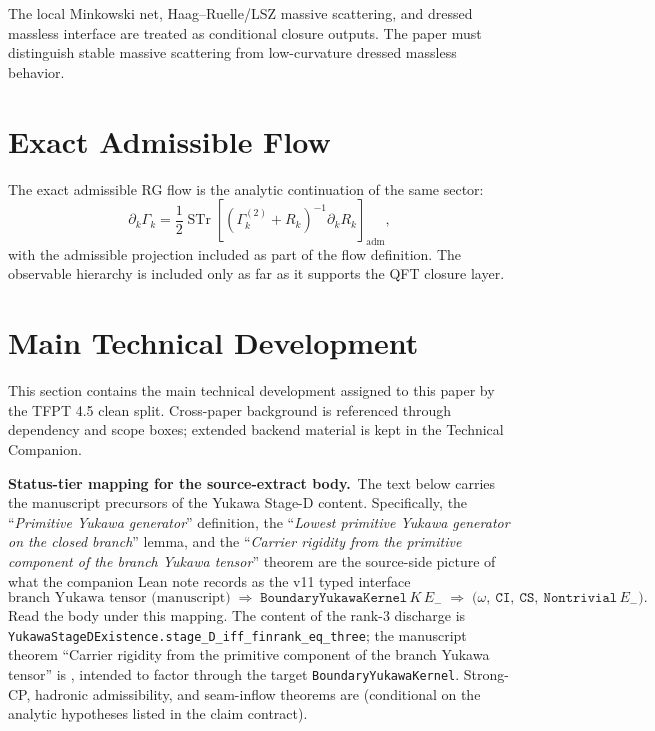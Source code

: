 The local Minkowski net, Haag--Ruelle/LSZ massive scattering, and dressed massless interface are
treated as conditional closure outputs. The paper must distinguish stable massive scattering from
low-curvature dressed massless behavior.

\section{Exact Admissible Flow}

The exact admissible RG flow is the analytic continuation of the same sector:
\[
\partial_k\Gamma_k
=
\frac12\operatorname{STr}\left[(\Gamma_k^{(2)}+R_k)^{-1}\partial_kR_k\right]_{\mathrm{adm}},
\]
with the admissible projection included as part of the flow definition. The observable hierarchy is
included only as far as it supports the QFT closure layer.

\clearpage
\section{Main Technical Development}

This section contains the main technical development assigned to this paper by the TFPT 4.5 clean split. Cross-paper background is referenced through dependency and scope boxes; extended backend material is kept in the Technical Companion.

\begin{tfptwarningbox}
\textbf{Status-tier mapping for the source-extract body.}\
The text below carries the manuscript precursors of the
Yukawa Stage-D content. Specifically, the
``\emph{Primitive Yukawa generator}'' definition, the
``\emph{Lowest primitive Yukawa generator on the closed
branch}'' lemma, and the ``\emph{Carrier rigidity from the
primitive component of the branch Yukawa tensor}'' theorem
are the source-side picture of what the companion Lean note
records as the v11 typed interface
\[
\text{branch Yukawa tensor (manuscript)}
\;\Longrightarrow\;
\texttt{BoundaryYukawaKernel}\,K\,E_-
\;\Longrightarrow\;
\bigl(\omega,\ \texttt{CI},\ \texttt{CS},\ \texttt{Nontrivial}\,E_-\bigr).
\]
Read the body under this mapping. The
 content of the rank-3 discharge is
\texttt{YukawaStageDExistence.stage\_D\_iff\_finrank\_eq\_three};
the manuscript theorem ``Carrier rigidity from the primitive
component of the branch Yukawa tensor'' is , intended
to factor through the  target
\texttt{BoundaryYukawaKernel}. Strong-CP, hadronic admissibility,
and seam-inflow theorems are \stag{C} (conditional on the
analytic hypotheses listed in the claim contract).
\end{tfptwarningbox}

